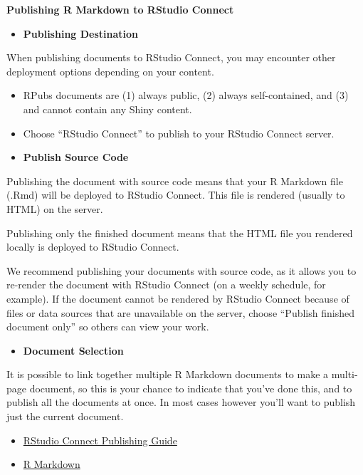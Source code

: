 \documentclass[]{book}
\providecommand{\tightlist}{%
  \setlength{\itemsep}{0pt}\setlength{\parskip}{0pt}}
\theoremstyle{definition}
\theoremstyle{definition}
\theoremstyle{definition}
\theoremstyle{remark}
\begin{document}
\textbf{Publishing R Markdown to RStudio Connect}

\begin{itemize}
\tightlist
\item
  \textbf{Publishing Destination}
\end{itemize}

When publishing documents to RStudio Connect, you may encounter other
deployment options depending on your content.

\begin{itemize}
\item
  RPubs documents are (1) always public, (2) always self-contained, and
  (3) and cannot contain any Shiny content.
\item
  Choose ``RStudio Connect'' to publish to your RStudio Connect server.
\item
  \textbf{Publish Source Code}
\end{itemize}

Publishing the document with source code means that your R Markdown file
(.Rmd) will be deployed to RStudio Connect. This file is rendered
(usually to HTML) on the server.

Publishing only the finished document means that the HTML file you
rendered locally is deployed to RStudio Connect.

We recommend publishing your documents with source code, as it allows
you to re-render the document with RStudio Connect (on a weekly
schedule, for example). If the document cannot be rendered by RStudio
Connect because of files or data sources that are unavailable on the
server, choose ``Publish finished document only'' so others can view
your work.

\begin{itemize}
\tightlist
\item
  \textbf{Document Selection}
\end{itemize}

It is possible to link together multiple R Markdown documents to make a
multi-page document, so this is your chance to indicate that you've done
this, and to publish all the documents at once. In most cases however
you'll want to publish just the current document.

\begin{itemize}
\item
  \href{https://docs.rstudio.com/connect/user/publishing.html\#publishing-documents}{RStudio
  Connect Publishing Guide}
\item
  \href{https://rmarkdown.rstudio.com/}{R Markdown}
\end{itemize}
\end{document}
